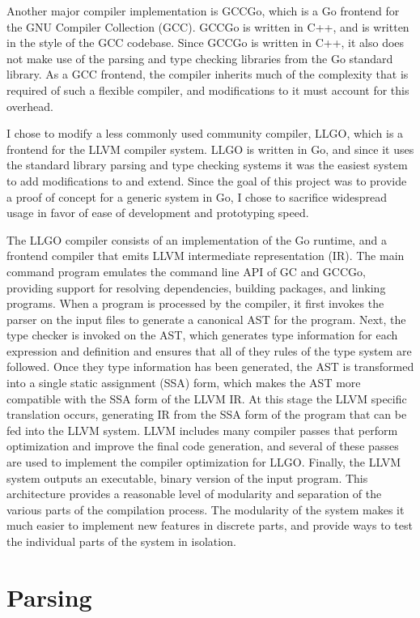 \documentclass[letterpaper,twocolumn,10pt]{article}
\begin{document}
 Another major compiler implementation is GCCGo, which is a Go frontend for the GNU Compiler Collection (GCC). GCCGo is written in C++, and is written in the style of the GCC codebase. Since GCCGo is written in C++, it also does not make use of the parsing and type checking libraries from the Go standard library. As a GCC frontend, the compiler inherits much of the complexity that is required of such a flexible compiler, and modifications to it must account for this overhead.

I chose to modify a less commonly used community compiler, LLGO, which is a frontend for the LLVM compiler system. LLGO is written in Go, and since it uses the standard library parsing and type checking systems it was the easiest system to add modifications to and extend. Since the goal of this project was to provide a proof of concept for a generic system in Go, I chose to sacrifice widespread usage in favor of ease of development and prototyping speed.

The LLGO compiler consists of an implementation of the Go runtime, and a frontend compiler that emits LLVM intermediate representation (IR). The main command program emulates the command line API of GC and GCCGo, providing support for resolving dependencies, building packages, and linking programs. When a program is processed by the compiler, it first invokes the parser on the input files to generate a canonical AST for the program. Next, the type checker is invoked on the AST, which generates type information for each expression and definition and ensures that all of they rules of the type system are followed. Once they type information has been generated, the AST is transformed into a single static assignment (SSA) form, which makes the AST more compatible with the SSA form of the LLVM IR. At this stage the LLVM specific translation occurs, generating IR from the SSA form of the program that can be fed into the LLVM system. LLVM includes many compiler passes that perform optimization and improve the final code generation, and several of these passes are used to implement the compiler optimization for LLGO. Finally, the LLVM system outputs an executable, binary version of the input program. This architecture provides a reasonable level of modularity and separation of the various parts of the compilation process. The modularity of the system makes it much easier to implement new features in discrete parts, and provide ways to test the individual parts of the system in isolation.

\section{Parsing} \label{parsing}
\end{document}
